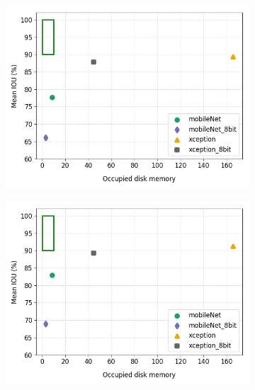 	\begin{figure}[!htb]
		\begin{subfigure}{.5\textwidth}
			\centering
			\includegraphics[width=1\linewidth]{images/q_mem_v_full}
		\end{subfigure}
		\begin{subfigure}{.5\textwidth}
			\centering
			\includegraphics[width=1\linewidth]{images/q_mem_v_size}
		\end{subfigure}
		\begin{subfigure}{.5\textwidth}
			\centering

\end{subfigure}
\end{figure}
